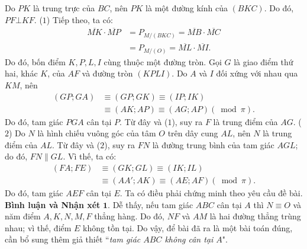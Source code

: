 \begin{multicols}{2}
\begin{figure}[H]
		\vspace*{-10pt}
	\end{figure}
	Do $PK$ là trung trực của $BC$, nên $PK$ là một đường kính của $(BKC)$. Do đó, $PF \bot KF$.   \hfill ($1$)
	\vskip 0.05cm
	Tiếp theo, ta có:
	\begin{align*}
		\overline {MK}  \cdot \overline {MP}  &= {P_{M/\left( {BKC} \right)}} = \overline {MB}  \cdot \overline {MC}  \\
		&= {P_{M/\left( O \right)}} = \overline {ML}  \cdot \overline {MI} .
	\end{align*}
	Do đó, bốn điểm $K, P, L, I$ cùng thuộc một đường tròn.
	\vskip 0.05cm
	Gọi $G$ là giao điểm thứ hai, khác $K$, của $AF$ và đường tròn $(KPLI)$.
	\vskip 0.05cm
	Do $A$ và $I$ đối xứng với nhau qua $KM$, nên
	\begin{align*}
		\left( {GP;GA} \right) &\equiv \left( {GP;GK} \right) \equiv \left( {IP;IK} \right) \\
		&\equiv \left( {AK;AP} \right) \equiv \left( {AG;AP} \right)\left( {\bmod \pi } \right).
	\end{align*}
	Do đó, tam giác $PGA$ cân tại $P$. Từ đây và ($1$), suy ra $F$ là trung điểm của $AG$. \hfill ($2$)
	\vskip 0.05cm
	Do $N$ là hình chiếu vuông góc của tâm $O$ trên dây cung $AL$, nên $N$ là trung điểm của $AL$. Từ đây và ($2$), suy ra $FN$ là đường trung bình của tam giác $AGL$; do đó,  $FN \parallel GL$. Vì thế, ta có:
	\begin{align*}
		\left( {FA;FE} \right) &\!\equiv\! \left( {GK;GL} \right) \equiv \left( {IK;IL} \right) \\
		&\!\equiv\! \left( {AA';AK} \right) \!\equiv\! \left( {AE;AF} \right)\left( {\!\bmod \pi } \right).	
	\end{align*}
	Do đó, tam giác $AEF$ cân tại $E$. Ta có điều phải chứng minh theo yêu cầu đề bài.
	\vskip 0.05cm
	\textbf{\color{thachthuctoanhoc}Bình luận và Nhận xét}
	\vskip 0.05cm
	$\pmb{1.}$ Dễ thấy, nếu tam giác $ABC$ cân tại $A$ thì $N \equiv O$ và năm điểm $A, K, N, M, F$ thẳng hàng. Do đó, $NF$ và $AM$ là hai đường thẳng trùng nhau; vì thế, điểm $E$ không tồn tại. Do vậy, để bài đã ra là một bài toán đúng, cần bổ sung thêm giả thiết ``\textit{tam giác $ABC$ không cân tại $A$}".

\end{multicols}
